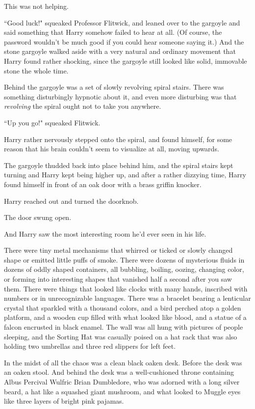 This was not helping.

``Good luck!" squeaked Professor Flitwick, and leaned over to the gargoyle and said something that Harry somehow failed to hear at all. (Of course, the password wouldn't be much good if you could hear someone saying it.) And the stone gargoyle walked aside with a very natural and ordinary movement that Harry found rather shocking, since the gargoyle still looked like solid, immovable stone the whole time.

Behind the gargoyle was a set of slowly revolving spiral stairs. There was something disturbingly hypnotic about it, and even more disturbing was that \emph{revolving} the spiral ought not to take you anywhere.

``Up you go!" squeaked Flitwick.

Harry rather nervously stepped onto the spiral, and found himself, for some reason that his brain couldn't seem to visualize at all, moving upwards.

The gargoyle thudded back into place behind him, and the spiral stairs kept turning and Harry kept being higher up, and after a rather dizzying time, Harry found himself in front of an oak door with a brass griffin knocker.

Harry reached out and turned the doorknob.

The door swung open.

And Harry saw the most interesting room he'd ever seen in his life.

There were tiny metal mechanisms that whirred or ticked or slowly changed shape or emitted little puffs of smoke. There were dozens of mysterious fluids in dozens of oddly shaped containers, all bubbling, boiling, oozing, changing color, or forming into interesting shapes that vanished half a second after you saw them. There were things that looked like clocks with many hands, inscribed with numbers or in unrecognizable languages. There was a bracelet bearing a lenticular crystal that sparkled with a thousand colors, and a bird perched atop a golden platform, and a wooden cup filled with what looked like blood, and a statue of a falcon encrusted in black enamel. The wall was all hung with pictures of people sleeping, and the Sorting Hat was casually poised on a hat rack that was also holding two umbrellas and three red slippers for left feet.

In the midst of all the chaos was a clean black oaken desk. Before the desk was an oaken stool. And behind the desk was a well-cushioned throne containing Albus Percival Wulfric Brian Dumbledore, who was adorned with a long silver beard, a hat like a squashed giant mushroom, and what looked to Muggle eyes like three layers of bright pink pajamas.

